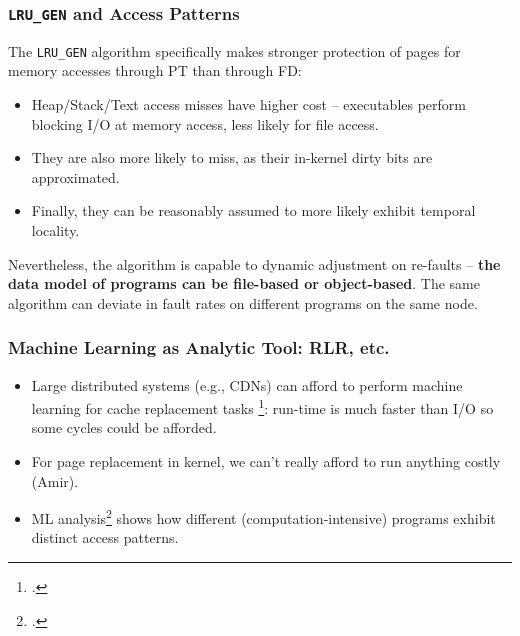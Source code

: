 \documentclass{beamer}
\begin{document}
\begin{frame}
    \frametitle{\texttt{LRU\_GEN} and Access Patterns}
    The \texttt{LRU\_GEN} algorithm specifically makes stronger protection of pages for memory accesses through PT than through FD: \
    \begin{itemize}
    \item Heap/Stack/Text access misses have higher cost -- executables perform blocking I/O at memory access, less likely for file access.
    \item They are also more likely to miss, as their in-kernel dirty bits are approximated.
    \item Finally, they can be reasonably assumed to more likely exhibit temporal locality.
    \end{itemize}
    Nevertheless, the algorithm is capable to dynamic adjustment on re-faults -- \textbf{the data model of programs can be file-based or object-based}.
    The same algorithm can deviate in fault rates on different programs on the same node.
\end{frame}

\begin{frame}
    \frametitle{Machine Learning as Analytic Tool: RLR, etc.}
    \begin{itemize}
        \item Large distributed systems (e.g., CDNs) can afford to perform machine learning for cache replacement tasks
              \footcite{GWHSZ.2014.CacheReplAsMDP-QLearning}: run-time is much faster than I/O so some cycles could be afforded.
        \item For page replacement in kernel, we can't really afford to run anything costly (Amir).
        \item ML analysis\footcite{SYS.2021.RLR} shows how different (computation-intensive) programs exhibit distinct
              access patterns.
    \end{itemize}
\end{frame}
\end{document}
